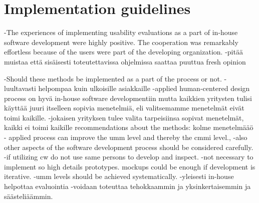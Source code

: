 \documentclass[12pt,a4paper,oneside,pdftex]{report}
\begin{document}








\section{Implementation guidelines}
\label{sec:implementationguidelines}

-The experiences of implementing usability evaluations as a part of in-house software development were highly positive. The cooperation was remarkably effortless because of the users were part of the developing organization.  
-pitää muistaa että sisäisesti toteutettavissa ohjelmissa saattaa puuttua fresh opinion

    -Should these methods be implemented as a part of the process or not.
-luultavasti helpompaa kuin ulkoisille asiakkaille
-applied human-centered design process on hyvä in-house software developmentiin mutta kaikkien yritysten tulisi käyttää juuri itselleen sopivia menetelmiä, eli valitsemamme menetelmät eivät toimi kaikille.
-jokaisen yrityksen tulee valita tarpeisiinsa sopivat menetelmät, kaikki ei toimi kaikille
recommendations about the methods: kolme menetelmääö
- applied process can improve the umm level and thereby the cmmi level.,
-also other aspects of the software development process should be considered carefully. 
-if utilizing cw do not use same persons to develop and inspect.
-not necessary to implement so high details prototypes. mockups could be enough if development is iterative.
-umm levels should be achieved systematically.
-yleisesti in-house helpottaa evaluointia
-voidaan toteuttaa tehokkaammin ja yksinkertaisemmin ja säästeliäämmin.
\end{document}

